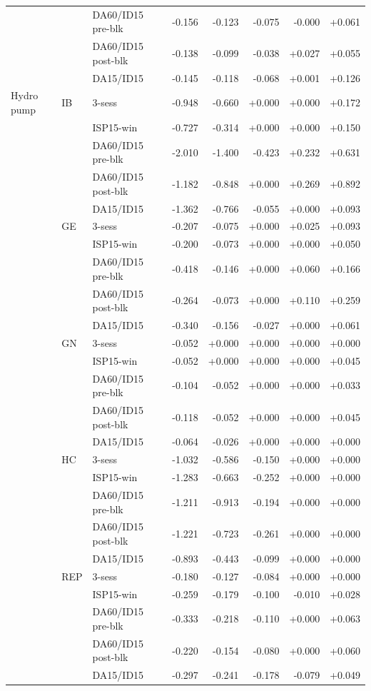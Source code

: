 \begin{tabular}{l l l r r r r r}
 &  & DA60/ID15 pre-blk & -0.156 & -0.123 & -0.075 & -0.000 & +0.061 \\
 &  & DA60/ID15 post-blk & -0.138 & -0.099 & -0.038 & +0.027 & +0.055 \\
 &  & DA15/ID15 & -0.145 & -0.118 & -0.068 & +0.001 & +0.126 \\
\addlinespace
Hydro pump & IB & 3-sess & -0.948 & -0.660 & +0.000 & +0.000 & +0.172 \\
 &  & ISP15-win & -0.727 & -0.314 & +0.000 & +0.000 & +0.150 \\
 &  & DA60/ID15 pre-blk & -2.010 & -1.400 & -0.423 & +0.232 & +0.631 \\
 &  & DA60/ID15 post-blk & -1.182 & -0.848 & +0.000 & +0.269 & +0.892 \\
 &  & DA15/ID15 & -1.362 & -0.766 & -0.055 & +0.000 & +0.093 \\
 & GE & 3-sess & -0.207 & -0.075 & +0.000 & +0.025 & +0.093 \\
 &  & ISP15-win & -0.200 & -0.073 & +0.000 & +0.000 & +0.050 \\
 &  & DA60/ID15 pre-blk & -0.418 & -0.146 & +0.000 & +0.060 & +0.166 \\
 &  & DA60/ID15 post-blk & -0.264 & -0.073 & +0.000 & +0.110 & +0.259 \\
 &  & DA15/ID15 & -0.340 & -0.156 & -0.027 & +0.000 & +0.061 \\
 & GN & 3-sess & -0.052 & +0.000 & +0.000 & +0.000 & +0.000 \\
 &  & ISP15-win & -0.052 & +0.000 & +0.000 & +0.000 & +0.045 \\
 &  & DA60/ID15 pre-blk & -0.104 & -0.052 & +0.000 & +0.000 & +0.033 \\
 &  & DA60/ID15 post-blk & -0.118 & -0.052 & +0.000 & +0.000 & +0.045 \\
 &  & DA15/ID15 & -0.064 & -0.026 & +0.000 & +0.000 & +0.000 \\
 & HC & 3-sess & -1.032 & -0.586 & -0.150 & +0.000 & +0.000 \\
 &  & ISP15-win & -1.283 & -0.663 & -0.252 & +0.000 & +0.000 \\
 &  & DA60/ID15 pre-blk & -1.211 & -0.913 & -0.194 & +0.000 & +0.000 \\
 &  & DA60/ID15 post-blk & -1.221 & -0.723 & -0.261 & +0.000 & +0.000 \\
 &  & DA15/ID15 & -0.893 & -0.443 & -0.099 & +0.000 & +0.000 \\
 & REP & 3-sess & -0.180 & -0.127 & -0.084 & +0.000 & +0.000 \\
 &  & ISP15-win & -0.259 & -0.179 & -0.100 & -0.010 & +0.028 \\
 &  & DA60/ID15 pre-blk & -0.333 & -0.218 & -0.110 & +0.000 & +0.063 \\
 &  & DA60/ID15 post-blk & -0.220 & -0.154 & -0.080 & +0.000 & +0.060 \\
 &  & DA15/ID15 & -0.297 & -0.241 & -0.178 & -0.079 & +0.049 \\
\bottomrule
\end{tabular}